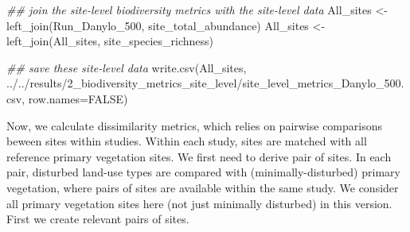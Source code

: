 \documentclass[
  letterpaper,
  DIV=11,
  numbers=noendperiod]{scrartcl}
\newenvironment{Shaded}{\begin{snugshade}}{\end{snugshade}}
\newcommand{\AttributeTok}[1]{\textcolor[rgb]{0.40,0.45,0.13}{#1}}
\newcommand{\ConstantTok}[1]{\textcolor[rgb]{0.56,0.35,0.01}{#1}}
\newcommand{\DocumentationTok}[1]{\textcolor[rgb]{0.37,0.37,0.37}{\textit{#1}}}
\newcommand{\FunctionTok}[1]{\textcolor[rgb]{0.28,0.35,0.67}{#1}}
\newcommand{\NormalTok}[1]{\textcolor[rgb]{0.00,0.23,0.31}{#1}}
\newcommand{\OtherTok}[1]{\textcolor[rgb]{0.00,0.23,0.31}{#1}}
\newcommand{\StringTok}[1]{\textcolor[rgb]{0.13,0.47,0.30}{#1}}
\begin{document}
\begin{Shaded}
\begin{Highlighting}[]
\DocumentationTok{\#\# join the site{-}level biodiversity metrics with the site{-}level data}
\NormalTok{All\_sites }\OtherTok{\textless{}{-}} \FunctionTok{left\_join}\NormalTok{(Run\_Danylo\_500, site\_total\_abundance)}
\NormalTok{All\_sites }\OtherTok{\textless{}{-}} \FunctionTok{left\_join}\NormalTok{(All\_sites, site\_species\_richness)}

\DocumentationTok{\#\# save these site{-}level data}
\FunctionTok{write.csv}\NormalTok{(All\_sites, }\StringTok{\textquotesingle{}../../results/2\_biodiversity\_metrics\_site\_level/site\_level\_metrics\_Danylo\_500.csv\textquotesingle{}}\NormalTok{, }\AttributeTok{row.names=}\ConstantTok{FALSE}\NormalTok{)}
\end{Highlighting}
\end{Shaded}

Now, we calculate dissimilarity metrics, which relies on pairwise
comparisons beween sites within studies. Within each study, sites are
matched with all reference primary vegetation sites. We first need to
derive pair of sites. In each pair, disturbed land-use types are
compared with (minimally-disturbed) primary vegetation, where pairs of
sites are available within the same study. We consider all primary
vegetation sites here (not just minimally disturbed) in this version.
First we create relevant pairs of sites.
\end{document}

